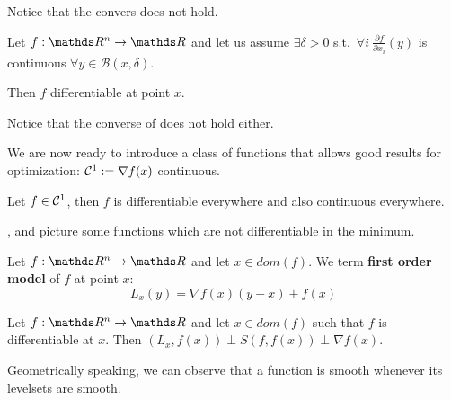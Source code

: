 \documentclass[ComputationalMathematics.tex]{subfiles}
\begin{document}
Notice that the convers does not hold.

\begin{proposition}\label{prop:27set1}
Let $f : \R^n \to \R$ and let us assume $\exists \delta > 0$ s.t.~$\forall i~\frac{\partial f}{\partial x_i}(y)$ is continuous $\forall y \in \mathcal{B}(x, \delta)$.

Then $f$ differentiable at point $x$.
\end{proposition}

Notice that the converse of  does not hold either.

We are now ready to introduce a class of functions that allows good results for optimization: ${\mathcal{C}}^{1} := \nabla f(x)$ continuous.

Let $f \in {\mathcal{C}}^{1}$, then $f$ is differentiable everywhere and also continuous everywhere.

,  and  picture some functions which are not differentiable in the minimum.




\begin{definition}
  Let $f: \R^n \to \R$ and let $x \in dom(f)$. We term \textbf{first order model} of $f$ at point $x$:
  \[
    L_x(y) = \nabla f(x) (y - x) + f(x)
  \]
\end{definition}

\begin{proposition}
  Let $f: \R^n \to \R$ and let $x \in dom(f)$ such that $f$ is differentiable at $x$. Then $(L_x, f(x)) \perp S(f, f(x)) \perp \nabla f(x)$.
\end{proposition}

Geometrically speaking, we can observe that a function is smooth whenever its levelsets are smooth.
\end{document}
